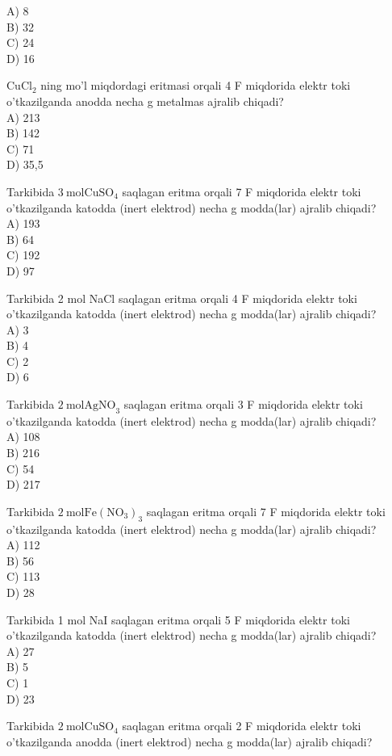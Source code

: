 A) 8\\
B) 32\\
C) 24\\
D) 16
  \item $\mathrm{CuCl}_{2}$ ning mo'l miqdordagi eritmasi orqali 4 F miqdorida elektr toki\\
o'tkazilganda anodda necha g metalmas ajralib chiqadi?\\
A) 213\\
B) 142\\
C) 71\\
D) 35,5
  \item Tarkibida $3 \mathrm{~mol} \mathrm{CuSO}_{4}$ saqlagan eritma orqali 7 F miqdorida elektr toki o'tkazilganda katodda (inert elektrod) necha g modda(lar) ajralib chiqadi?\\
A) 193\\
B) 64\\
C) 192\\
D) 97
  \item Tarkibida 2 mol NaCl saqlagan eritma orqali 4 F miqdorida elektr toki o'tkazilganda katodda (inert elektrod) necha g modda(lar) ajralib chiqadi?\\
A) 3\\
B) 4\\
C) 2\\
D) 6
  \item Tarkibida $2 \mathrm{~mol} \mathrm{AgNO}_{3}$ saqlagan eritma orqali 3 F miqdorida elektr toki o'tkazilganda katodda (inert elektrod) necha g modda(lar) ajralib chiqadi?\\
A) 108\\
B) 216\\
C) 54\\
D) 217
  \item Tarkibida $2 \mathrm{~mol} \mathrm{Fe}\left(\mathrm{NO}_{3}\right)_{3}$ saqlagan eritma orqali 7 F miqdorida elektr toki o'tkazilganda katodda (inert elektrod) necha g modda(lar) ajralib chiqadi?\\
A) 112\\
B) 56\\
C) 113\\
D) 28
  \item Tarkibida 1 mol NaI saqlagan eritma orqali 5 F miqdorida elektr toki o'tkazilganda katodda (inert elektrod) necha g modda(lar) ajralib chiqadi?\\
A) 27\\
B) 5\\
C) 1\\
D) 23
  \item Tarkibida $2 \mathrm{~mol} \mathrm{CuSO}_{4}$ saqlagan eritma orqali 2 F miqdorida elektr toki o'tkazilganda anodda (inert elektrod) necha g modda(lar) ajralib chiqadi?\\
